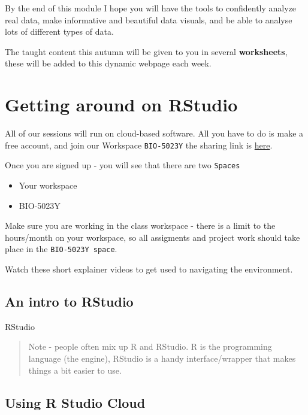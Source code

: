 \documentclass[
]{book}
\begin{document}
By the end of this module I hope you will have the tools to confidently analyze real data, make informative and beautiful data visuals, and be able to analyse lots of different types of data.

The taught content this autumn will be given to you in several \textbf{worksheets}, these will be added to this dynamic webpage each week.

\hypertarget{getting-around-on-rstudio}{%
\section{Getting around on RStudio}\label{getting-around-on-rstudio}}

All of our sessions will run on cloud-based software. All you have to do is make a free account, and join our Workspace \texttt{BIO-5023Y} the sharing link is \href{https://rstudio.cloud/spaces/84058/join?access_code=6c3uEkEUsNhbzUrttMcRq3SoSkQ4vKw\%2FeYBoyBRu}{here}.

Once you are signed up - you will see that there are two \texttt{Spaces}

\begin{itemize}
\item
  Your workspace
\item
  BIO-5023Y
\end{itemize}

Make sure you are working in the class workspace - there is a limit to the hours/month on your workspace, so all assigments and project work should take place in the \texttt{BIO-5023Y\ space}.

Watch these short explainer videos to get used to navigating the environment.

\hypertarget{an-intro-to-rstudio}{%
\subsection{An intro to RStudio}\label{an-intro-to-rstudio}}

RStudio

\begin{quote}
Note - people often mix up R and RStudio. R is the programming language (the engine), RStudio is a handy interface/wrapper that makes things a bit easier to use.
\end{quote}

\hypertarget{using-r-studio-cloud}{%
\subsection{Using R Studio Cloud}\label{using-r-studio-cloud}}
\end{document}
